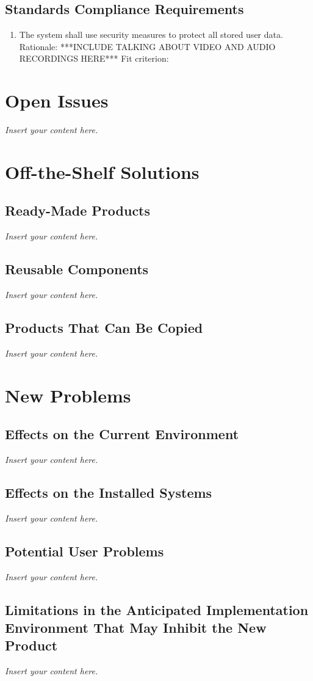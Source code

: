 \documentclass[12pt]{article}
\newcommand{\lips}{\textit{Insert your content here.}}
\begin{document}
\subsection{Standards Compliance Requirements}
\begin{enumerate}[{CR-STD}1. ]
  \item The system shall use security measures to protect all stored user data.\\
  Rationale: ***INCLUDE TALKING ABOUT VIDEO AND AUDIO RECORDINGS HERE***
  Fit criterion: 
\end{enumerate}

\section{Open Issues}
\lips

\section{Off-the-Shelf Solutions}
\subsection{Ready-Made Products}
\lips
\subsection{Reusable Components}
\lips
\subsection{Products That Can Be Copied}
\lips

\section{New Problems}
\subsection{Effects on the Current Environment}
\lips
\subsection{Effects on the Installed Systems}
\lips
\subsection{Potential User Problems}
\lips
\subsection{Limitations in the Anticipated Implementation Environment That May
Inhibit the New Product}
\lips
\end{document}
